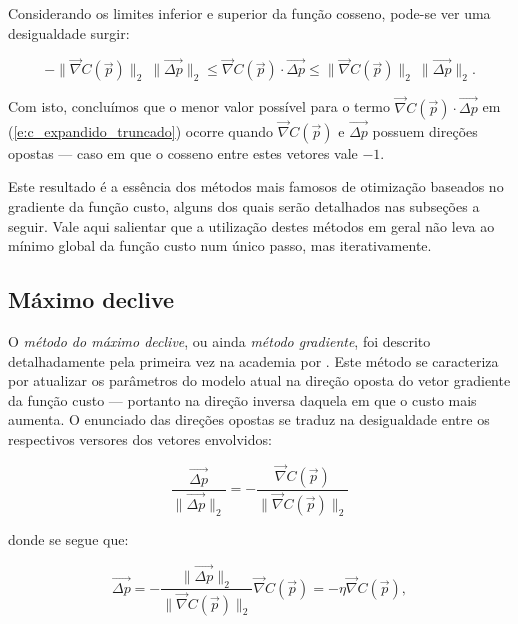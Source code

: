     Considerando os limites inferior e superior da função cosseno, pode-se ver uma desigualdade surgir:

    \begin{equation} \label{e:grad_desigualdade_cosseno}
      -\|\vec{\nabla} C(\vec{p})\|_2\ \|\vec{\Delta p}\|_2 \le \vec{\nabla} C(\vec{p}) \cdot \vec{\Delta p} \le \|\vec{\nabla} C(\vec{p})\|_2\ \|\vec{\Delta p}\|_2
      .
    \end{equation}

    Com isto, concluímos que o menor valor possível para o termo $\vec{\nabla} C(\vec{p}) \cdot \vec{\Delta p}$ em (\ref{e:c_expandido_truncado}) ocorre quando $\vec{\nabla} C(\vec{p})$ e $\vec{\Delta p}$ possuem direções opostas --- caso em que o cosseno entre estes vetores vale $-1$.

    Este resultado é a essência dos métodos mais famosos de otimização baseados no gradiente da função custo, alguns dos quais serão detalhados nas subseções a seguir. Vale aqui salientar que a utilização destes métodos em geral não leva ao mínimo global da função custo num único passo, mas iterativamente.


    \subsection{Máximo declive} \label{s:maximo_declive}

      O \emph{método do máximo declive}, ou ainda \emph{método gradiente}, foi descrito detalhadamente pela primeira vez na academia por . Este método se caracteriza por atualizar os parâmetros do modelo atual na direção oposta do vetor gradiente da função custo --- portanto na direção inversa daquela em que o custo mais aumenta. O enunciado das direções opostas se traduz na desigualdade entre os respectivos versores dos vetores envolvidos:

      \begin{equation} \label{e:oposicao_grad_c_delta_p}
        \frac{\vec{\Delta p}}{\|\vec{\Delta p}\|_2} =
        - \frac{\vec{\nabla} C(\vec{p})}{\|\vec{\nabla} C(\vec{p})\|_2}
      \end{equation}

      \noindent donde se segue que:

      \begin{equation} \label{e:dp_maximo_declive}
        \vec{\Delta p}
          = - \frac{\|\vec{\Delta p}\|_2}{\|\vec{\nabla} C(\vec{p})\|_2} \vec{\nabla} C(\vec{p})
          = - \eta \vec{\nabla} C(\vec{p})
          ,
      \end{equation}

